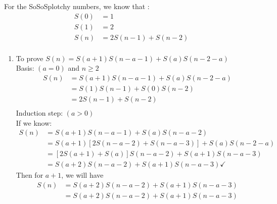 \documentclass{article}
\begin{document}
For the SoSoSplotchy numbers, we know that : 
\begin{align*} 
S(0) &= 1 \\
S(1) &=2 \\
S(n) &= 2S(n-1)+S(n-2) \\
\end{align*}
\begin{enumerate} [label=(\alph*)]
\item
To prove $S(n) = S(a+1)S(n-a-1) + S(a)S(n-2-a) $ \\
Basis:   $(a=0)$ and $n\geq2$ \\
\begin{align*} S(n)  &= S(a+1)S(n-a-1) + S(a)S(n-2-a) \\
	& = S(1)S(n-1) + S(0)S(n-2) \\
	& = 2S(n-1) + S(n-2)     \\
\end{align*} 
Induction step: $(a > 0)$  \\ 
If we know: 
\begin{align*} 
	S(n) & = S(a+1)S(n-a-1)+S(a)S(n-a-2)  \\
		& = S(a+1)[2S(n-a-2)+S(n-a-3)] + S(a)S(n-2-a) \\
		& = [2S(a+1) +S(a) ] S(n-a-2) + S(a+1) S(n-a-3)  \\ 
		& = S(a+2) S(n-a-2) + S(a+1) S(n-a-3)   \checkmark
\end{align*} 
Then for $a+1$, we will have 
\begin{align*} 
	S(n) & = S(a+2) S(n-a-2) + S(a+1) S(n-a-3) \\
		& = S(a+2)S(n-a-2) +S(a+1)S(n-a-3) \\
\end{align*}
	

\end{enumerate}
\end{document}
